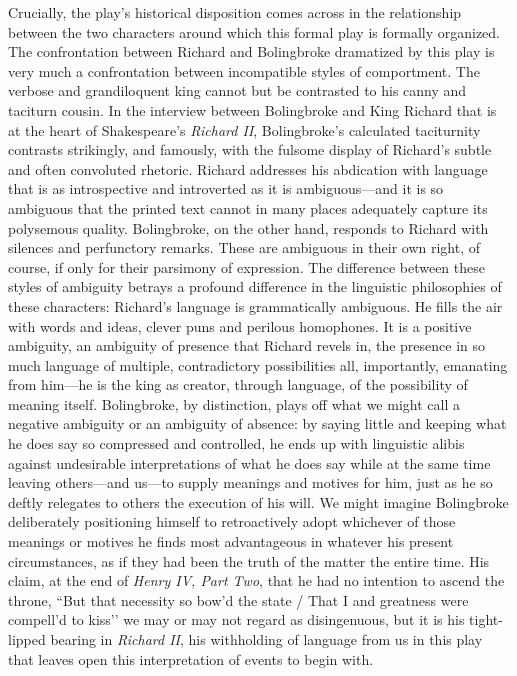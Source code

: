Crucially, the play’s historical disposition comes across in the relationship between the two characters around which this formal play is formally organized.
The confrontation between Richard and Bolingbroke dramatized by this play is very much a confrontation between incompatible styles of comportment.
The verbose and grandiloquent king cannot but be contrasted to his canny and taciturn cousin.
In the interview between Bolingbroke and King Richard that is at the heart of Shakespeare’s \emph{Richard II}, Bolingbroke’s calculated taciturnity contrasts strikingly, and famously, with the fulsome display of Richard’s subtle and often convoluted rhetoric.
Richard addresses his abdication with language that is as introspective and introverted as it is ambiguous---and it is so ambiguous that the printed text cannot in many places adequately capture its polysemous quality.
Bolingbroke, on the other hand, responds to Richard with silences and perfunctory remarks.
These are ambiguous in their own right, of course, if only for their parsimony of expression.
The difference between these styles of ambiguity betrays a profound difference in the linguistic philosophies of these characters: Richard’s language is grammatically ambiguous.
He fills the air with words and ideas, clever puns and perilous homophones.
It is a positive ambiguity, an ambiguity of presence that Richard revels in, the presence in so much language of multiple, contradictory possibilities all, importantly, emanating from him---he is the king as creator, through language, of the possibility of meaning itself.
Bolingbroke, by distinction, plays off what we might call a negative ambiguity or an ambiguity of absence: by saying little and keeping what he does say so compressed and controlled, he ends up with linguistic alibis against undesirable interpretations of what he does say while at the same time leaving others---and us---to supply meanings and motives for him, just as he so deftly relegates to others the execution of his will.
We might imagine Bolingbroke deliberately positioning himself to retroactively adopt whichever of those meanings or motives he finds most advantageous in whatever his present circumstances, as if they had been the truth of the matter the entire time.
His claim, at the end of \emph{Henry IV, Part Two}, that he had no intention to ascend the throne, ``But that necessity so bow'd the state / That I and greatness were compell'd to kiss’’ we may or may not regard as disingenuous, but it is his tight-lipped bearing in \emph{Richard II}, his withholding of language from us in this play that leaves open this interpretation of events to begin with.


